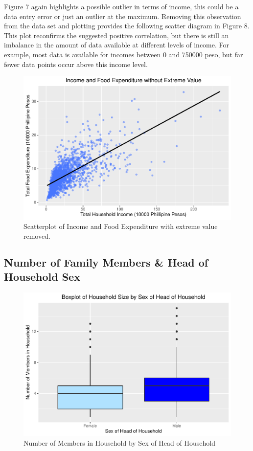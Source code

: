 \documentclass[
]{article}
\begin{document}
Figure 7 again highlights a possible outlier in terms of income, this
could be a data entry error or just an outlier at the maximum. Removing
this observation from the data set and plotting provides the following
scatter diagram in Figure 8. This plot reconfirms the suggested positive
correlation, but there is still an imbalance in the amount of data
available at different levels of income. For example, most data is
available for incomes between 0 and 750000 peso, but far fewer data
points occur above this income level.

\begin{figure}[H]

{\centering \includegraphics[width=0.8\linewidth]{Group_01_Project2_demo_files/figure-latex/balance without outlier-1} 

}

\caption{Scatterplot of Income and Food Expenditure with extreme value removed.}\label{fig:balance without outlier}
\end{figure}

\hypertarget{number-of-family-members-head-of-household-sex}{%
\subsection{Number of Family Members \& Head of Household
Sex}\label{number-of-family-members-head-of-household-sex}}

\begin{figure}[H]

{\centering \includegraphics[width=0.8\linewidth]{Group_01_Project2_demo_files/figure-latex/boxplot of sex and members-1} 

}

\caption{Number of Members in Household by Sex of Head of Household}\label{fig:boxplot of sex and members}
\end{figure}
\end{document}
